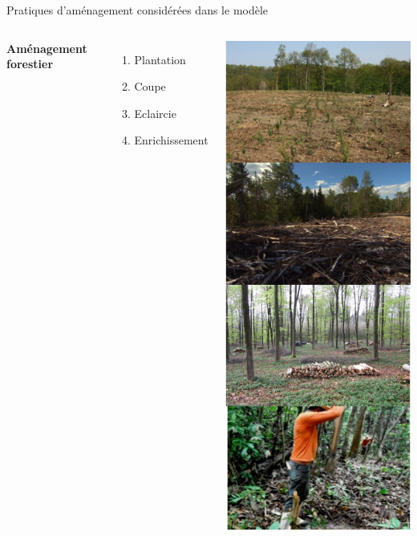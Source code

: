\documentclass[11pt, compress, aspectratio=1610]{beamer}
\providecommand{\tightlist}{%
  \setlength{\itemsep}{0pt}\setlength{\parskip}{0pt}}
\newcommand{\begincols}{\begin{columns}}
\newcommand{\stopcols}{\end{columns}}
\begin{document}
\begin{frame}{Pratiques d’aménagement considérées dans le modèle}
\protect\hypertarget{pratiques-damuxe9nagement-considuxe9ruxe9es-dans-le-moduxe8le}{}

\begincols
{}

\textbf{Aménagement forestier}

\begin{enumerate}
    \def\arabic{enumi}.{\arabic{enumi}.}
    \tightlist
    \item
      Plantation
    \item
      Coupe
    \item
      Eclaircie
    \item
      Enrichissement
  \end{enumerate}

\hfill{}
    \centering

\includegraphics[scale=0.50]{figures/managPrac}

\par
\stopcols

\end{frame}
\end{document}
